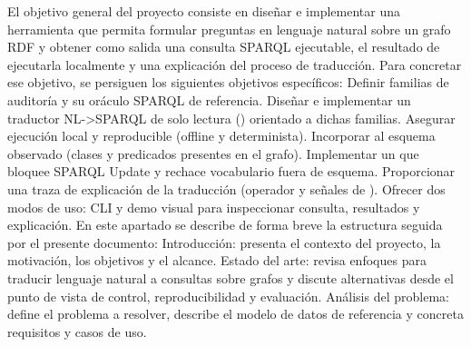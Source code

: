 {}\markdownRendererInterblockSeparator
{}\markdownRendererInterblockSeparator
{}El objetivo general del proyecto consiste en diseñar e implementar una herramienta que permita formular preguntas en lenguaje natural sobre un grafo RDF y obtener como salida una consulta SPARQL ejecutable, el resultado de ejecutarla localmente y una explicación del proceso de traducción.\markdownRendererInterblockSeparator
{}\markdownRendererInterblockSeparator
{}Para concretar ese objetivo, se persiguen los siguientes objetivos específicos:\markdownRendererInterblockSeparator
{}\markdownRendererUlBeginTight
\markdownRendererUlItem Definir familias de auditoría y su oráculo SPARQL de referencia.\markdownRendererUlItemEnd 
\markdownRendererUlItem Diseñar e implementar un traductor NL->SPARQL de solo lectura () orientado a dichas familias.\markdownRendererUlItemEnd 
\markdownRendererUlItem Asegurar ejecución local y reproducible (offline y determinista).\markdownRendererUlItemEnd 
\markdownRendererUlItem Incorporar  al esquema observado (clases y predicados presentes en el grafo).\markdownRendererUlItemEnd 
\markdownRendererUlItem Implementar un  que bloquee SPARQL Update y rechace vocabulario fuera de esquema.\markdownRendererUlItemEnd 
\markdownRendererUlItem Proporcionar una traza de explicación de la traducción (operador y señales de ).\markdownRendererUlItemEnd 
\markdownRendererUlItem Ofrecer dos modos de uso: CLI y demo visual para inspeccionar consulta, resultados y explicación.\markdownRendererUlItemEnd 
\markdownRendererUlEndTight \markdownRendererInterblockSeparator
{}\markdownRendererInterblockSeparator
{}En este apartado se describe de forma breve la estructura seguida por el presente documento:\markdownRendererInterblockSeparator
{}\markdownRendererUlBeginTight
\markdownRendererUlItem Introducción: presenta el contexto del proyecto, la motivación, los objetivos y el alcance.\markdownRendererUlItemEnd 
\markdownRendererUlItem Estado del arte: revisa enfoques para traducir lenguaje natural a consultas sobre grafos y discute alternativas desde el punto de vista de control, reproducibilidad y evaluación.\markdownRendererUlItemEnd 
\markdownRendererUlItem Análisis del problema: define el problema a resolver, describe el modelo de datos de referencia y concreta requisitos y casos de uso.\markdownRendererUlItemEnd 
